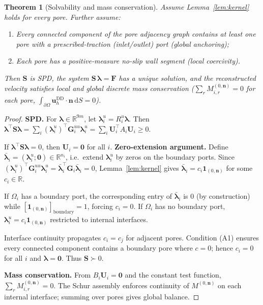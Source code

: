 \documentclass[11pt,a4paper]{article}
\newtheorem{theorem}[lemma]{Theorem}
\newcommand{\R}{\mathbb{R}}
\newcommand{\dom}{\Omega}
\newcommand{\pore}[1]{\Omega_{#1}}
\newcommand{\vel}{\bm{u}}
\newcommand{\normal}{\bm{n}}
\newcommand{\trac}{\bm{\lambda}}
\newcommand{\DtN}{\mathbf{G}}
\newcommand{\Schur}{\mathbf{S}}
\newcommand{\one}{\mathbf{1}}
\newcommand{\respvel}{\mathbf{U}}
\begin{document}
\begin{theorem}[Solvability and mass conservation]\label{thm:main}
  Assume Lemma~\ref{lem:kernel} holds for every pore.
  Further assume:
  \begin{enumerate}[label=(A\arabic*),nosep,leftmargin=*]
    \item Every connected component of the pore adjacency graph contains
      at least one pore with a prescribed-traction (inlet/outlet) port
      (\emph{global anchoring});
    \item Each pore has a positive-measure no-slip wall segment
      (\emph{local coercivity}).
  \end{enumerate}
  Then $\Schur$ is SPD, the system $\Schur\,\trac = \bm{F}$ has a unique
  solution, and the reconstructed velocity satisfies local and global
  discrete mass conservation ($\sum_r M_{i,r}^{(0,\normal)} = 0$ for each
  pore, $\int_{\partial\dom}\vel_h^{\text{DD}}\cdot\normal\,\mathrm{d}S=0$).
\end{theorem}

\begin{proof}
  \textbf{SPD.}  For $\trac \in \R^{9m}$, let $\trac_i^u = R_i^u\trac$.
  Then $\trac^\top\Schur\trac = \sum_i (\trac_i^u)^\top \DtN_i^{uu}\trac_i^u
   = \sum_i \respvel_i^\top A_i \respvel_i \ge 0$.

  If $\trac^\top\Schur\trac = 0$, then $\respvel_i = \bm{0}$ for all $i$.
  \textbf{Zero-extension argument.}  Define
  $\bar{\trac}_i = (\trac_i^u; \bm{0}) \in \R^{n_i}$, i.e.\ extend
  $\trac_i^u$ by zeros on the boundary ports.  Since
  $(\trac_i^u)^\top \DtN_i^{uu} \trac_i^u
   = \bar{\trac}_i^\top \DtN_i \bar{\trac}_i = 0$,
  Lemma~\ref{lem:kernel} gives
  $\bar{\trac}_i = c_i \one_{(0,\normal)}$ for some $c_i \in \R$.

  If $\pore{i}$ has a boundary port, the corresponding entry of
  $\bar{\trac}_i$ is $0$ (by construction) while
  $[\one_{(0,\normal)}]_{\text{boundary}} = 1$, forcing $c_i = 0$.
  If $\pore{i}$ has no boundary port, $\trac_i^u = c_i\one_{(0,\normal)}$
  restricted to internal interfaces.

  Interface continuity propagates $c_i = c_j$ for adjacent pores.
  Condition (A1) ensures every connected component contains a boundary
  pore where $c = 0$; hence $c_i = 0$ for all $i$ and $\trac = \bm{0}$.
  Thus $\Schur \succ 0$.

  \textbf{Mass conservation.}  From $B_i\respvel_i = \bm{0}$ and the
  constant test function, $\sum_r M_{i,r}^{(0,\normal)} = 0$.
  The Schur assembly enforces continuity of $M^{(0,\normal)}$ on each
  internal interface; summing over pores gives global balance.
\end{proof}
\end{document}
